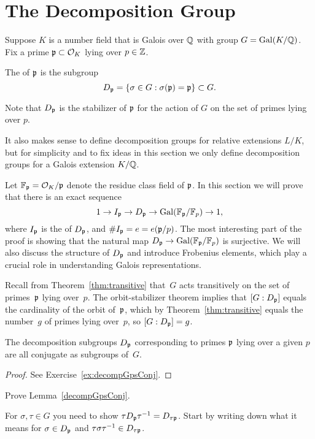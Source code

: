 \section{The Decomposition Group}

Suppose $K$ is a number field that is Galois over $\mathbb{Q}$ with
group $G=\operatorname{Gal}(K/\mathbb{Q})$. Fix a prime $\mathfrak{p}\subset \mathcal{O}_K$ lying over $p\in\mathbb{Z}$.
\begin{definition}\label{def:decomp}
	The  of $\mathfrak{p}$ is the subgroup
	$$
		D_{\mathfrak{p}} = \{\sigma \in G : \sigma(\mathfrak{p})=\mathfrak{p}\} \subset G.
	$$
\end{definition}
Note that $D_{\mathfrak{p}}$ is the stabilizer of $\mathfrak{p}$ for
the action of $G$ on the set of primes lying over $p$.

It also makes sense to define decomposition groups for relative
extensions $L/K$, but for simplicity and to fix ideas in this section
we only define decomposition groups for a Galois extension $K/\mathbb{Q}$.

Let $\mathbb{F}_{\mathfrak{p}} = \mathcal{O}_K/\mathfrak{p}$ denote the residue class field of $\mathfrak{p}$.
In this section we will prove that there is an exact sequence
$$
	1\to I_{\mathfrak{p}} \to D_{\mathfrak{p}} \to \operatorname{Gal}(\mathbb{F}_{\mathfrak{p}}/\mathbb{F}_p)\to 1,
$$
where $I_{\mathfrak{p}}$ is the  of $D_{\mathfrak{p}}$, and $\#I_{\mathfrak{p}}=e = e(\mathfrak{p}/p)$.
The most interesting part of the proof is showing that the natural
map $D_{\mathfrak{p}}\to  \operatorname{Gal}(\mathbb{F}_{\mathfrak{p}}/\mathbb{F}_p)$ is surjective.
We will also discuss the structure of $D_{\mathfrak{p}}$ and introduce
Frobenius elements, which play a crucial role in understanding Galois
representations.


Recall from Theorem~\ref{thm:transitive} that~$G$ acts transitively
on the set of primes~$\mathfrak{p}$ lying over~$p$.
The orbit-stabilizer theorem implies that $[G:D_{\mathfrak{p}}]$ equals the
cardinality of the orbit of~$\mathfrak{p}$, which by Theorem~\ref{thm:transitive}
equals the number~$g$ of primes lying over~$p$, so $[G:D_{\mathfrak{p}}]=g$.

\begin{lemma}\label{decompGpsConj}
	The decomposition subgroups $D_{\mathfrak{p}}$ corresponding to primes $\mathfrak{p}$
	lying over a given $p$ are all conjugate as subgroups of~$G$.
\end{lemma}
\begin{proof}
	See Exercise~\ref{ex:decompGpsConj}.
\end{proof}

\begin{exercise}\label{ex:decompGpsConj}
	Prove Lemma~\ref{decompGpsConj}.

	\begin{hint}
		For $\sigma,\tau\in G$ you need to show
		$\tau D_{\mathfrak{p}} \tau^{-1} = D_{\tau\mathfrak{p}}$.
		Start by writing down what it means for $\sigma\in D_{\mathfrak{p}}$
		and $\tau\sigma\tau^{-1}\in D_{\tau\mathfrak{p}}$.
	\end{hint}
\end{exercise}

